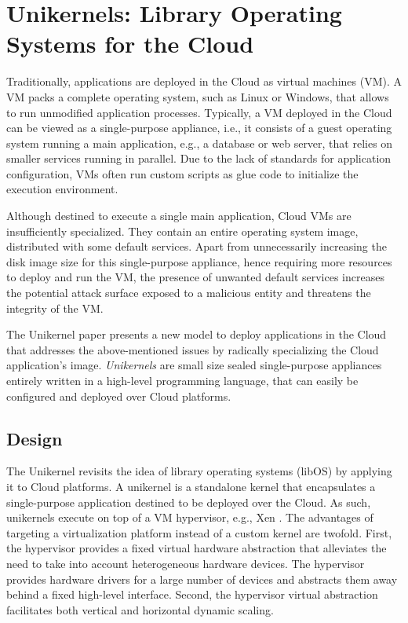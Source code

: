 \section{Unikernels: Library Operating Systems for the Cloud}
Traditionally, applications are deployed in the Cloud as virtual machines (VM).
A VM packs a complete operating system, such as Linux or Windows, that allows to run unmodified application processes.
Typically, a VM deployed in the Cloud can be viewed as a single-purpose appliance, i.e., it consists of a guest operating system running a main application, e.g., a database or web server, that relies on smaller services running in parallel.
Due to the lack of standards for application configuration, VMs often run custom scripts as glue code to initialize the execution environment.

Although destined to execute a single main application, Cloud VMs are insufficiently specialized.
They contain an entire operating system image, distributed with some default services.
Apart from unnecessarily increasing the disk image size for this single-purpose appliance, hence requiring more resources to deploy and run the VM, the presence of unwanted default services increases the potential attack surface exposed to a malicious entity and threatens the integrity of the VM.

The Unikernel paper \cite{DBLP:conf/asplos/MadhavapeddyMRSSGSHC13} presents a new model to deploy applications in the Cloud that addresses the above-mentioned issues by radically specializing the Cloud application's image.
\emph{Unikernels} are small size sealed single-purpose appliances entirely written in a high-level programming language, that can easily be configured and deployed over Cloud platforms.

\subsection{Design}
The Unikernel revisits the idea of library operating systems (libOS) by applying it to Cloud platforms.
A unikernel is a standalone kernel that encapsulates a single-purpose application destined to be deployed over the Cloud.
As such, unikernels execute on top of a VM hypervisor, e.g., Xen \cite{DBLP:conf/sosp/BarhamDFHHHN03}.
The advantages of targeting a virtualization platform instead of a custom kernel are twofold.
First, the hypervisor provides a fixed virtual hardware abstraction that alleviates the need to take into account heterogeneous hardware devices.
The hypervisor provides hardware drivers for a large number of devices and abstracts them away behind a fixed high-level interface.
Second, the hypervisor virtual abstraction facilitates both vertical and horizontal dynamic scaling.

